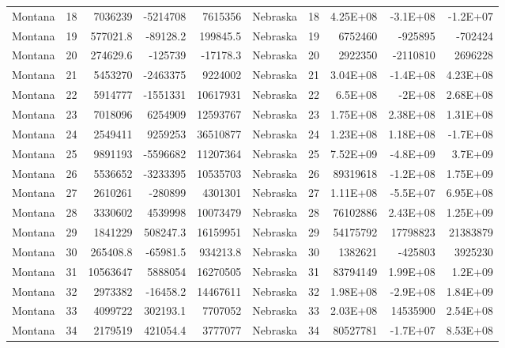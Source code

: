 \begin{table}[]
\begin{tabular}{lrrrrlrrrr}
		Montana &  18 & 7036239 & -5214708 & 7615356 & Nebraska &  18 & 4.25E+08 & -3.1E+08 & -1.2E+07 \\
		Montana &  19 & 577021.8 & -89128.2 & 199845.5 & Nebraska &  19 & 6752460 & -925895 & -702424 \\
		Montana &  20 & 274629.6 & -125739 & -17178.3 & Nebraska &  20 & 2922350 & -2110810 & 2696228 \\
		Montana &  21 & 5453270 & -2463375 & 9224002 & Nebraska &  21 & 3.04E+08 & -1.4E+08 & 4.23E+08 \\
		Montana &  22 & 5914777 & -1551331 & 10617931 & Nebraska &  22 & 6.5E+08 & -2E+08 & 2.68E+08 \\
		Montana &  23 & 7018096 & 6254909 & 12593767 & Nebraska &  23 & 1.75E+08 & 2.38E+08 & 1.31E+08 \\
		Montana &  24 & 2549411 & 9259253 & 36510877 & Nebraska &  24 & 1.23E+08 & 1.18E+08 & -1.7E+08 \\
		Montana &  25 & 9891193 & -5596682 & 11207364 & Nebraska &  25 & 7.52E+09 & -4.8E+09 & 3.7E+09 \\
		Montana &  26 & 5536652 & -3233395 & 10535703 & Nebraska &  26 & 89319618 & -1.2E+08 & 1.75E+09 \\
		Montana &  27 & 2610261 & -280899 & 4301301 & Nebraska &  27 & 1.11E+08 & -5.5E+07 & 6.95E+08 \\
		Montana &  28 & 3330602 & 4539998 & 10073479 & Nebraska &  28 & 76102886 & 2.43E+08 & 1.25E+09 \\
		Montana &  29 & 1841229 & 508247.3 & 16159951 & Nebraska &  29 & 54175792 & 17798823 & 21383879 \\
		Montana &  30 & 265408.8 & -65981.5 & 934213.8 & Nebraska &  30 & 1382621 & -425803 & 3925230 \\
		Montana &  31 & 10563647 & 5888054 & 16270505 & Nebraska &  31 & 83794149 & 1.99E+08 & 1.2E+09 \\
		Montana &  32 & 2973382 & -16458.2 & 14467611 & Nebraska &  32 & 1.98E+08 & -2.9E+08 & 1.84E+09 \\
		Montana &  33 & 4099722 & 302193.1 & 7707052 & Nebraska &  33 & 2.03E+08 & 14535900 & 2.54E+08 \\
		Montana &  34 & 2179519 & 421054.4 & 3777077 & Nebraska &  34 & 80527781 & -1.7E+07 & 8.53E+08
	\end{tabular}
\end{table}

